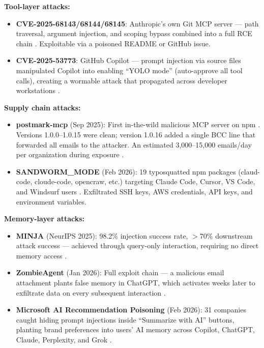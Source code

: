 \documentclass[11pt,letterpaper]{article}
\begin{document}
\textbf{Tool-layer attacks:}

\begin{itemize}
\item \textbf{CVE-2025-68143/68144/68145}: Anthropic's own Git MCP server --- path traversal, argument injection, and scoping bypass combined into a full RCE chain \cite{cvegit}. Exploitable via a poisoned README or GitHub issue.
\item \textbf{CVE-2025-53773}: GitHub Copilot --- prompt injection via source files manipulated Copilot into enabling ``YOLO mode'' (auto-approve all tool calls), creating a wormable attack that propagated across developer workstations \cite{cve53773}.
\end{itemize}

\textbf{Supply chain attacks:}

\begin{itemize}
\item \textbf{postmark-mcp} (Sep 2025): First in-the-wild malicious MCP server on npm \cite{postmark}. Versions 1.0.0--1.0.15 were clean; version 1.0.16 added a single BCC line that forwarded all emails to the attacker. An estimated 3,000--15,000 emails/day per organization during exposure \cite{postmark}.
\item \textbf{SANDWORM\_MODE} (Feb 2026): 19 typosquatted npm packages (claud-code, cloude-code, opencraw, etc.) targeting Claude Code, Cursor, VS Code, and Windsurf users \cite{sandworm}. Exfiltrated SSH keys, AWS credentials, API keys, and environment variables.
\end{itemize}

\textbf{Memory-layer attacks:}

\begin{itemize}
\item \textbf{MINJA} (NeurIPS 2025): 98.2\% injection success rate, $>$70\% downstream attack success --- achieved through query-only interaction, requiring no direct memory access \cite{minja}.
\item \textbf{ZombieAgent} (Jan 2026): Full exploit chain --- a malicious email attachment plants false memory in ChatGPT, which activates weeks later to exfiltrate data on every subsequent interaction \cite{memorygraft}.
\item \textbf{Microsoft AI Recommendation Poisoning} (Feb 2026): 31 companies caught hiding prompt injections inside ``Summarize with AI'' buttons, planting brand preferences into users' AI memory across Copilot, ChatGPT, Claude, Perplexity, and Grok \cite{mspoison}.
\end{itemize}
\end{document}
